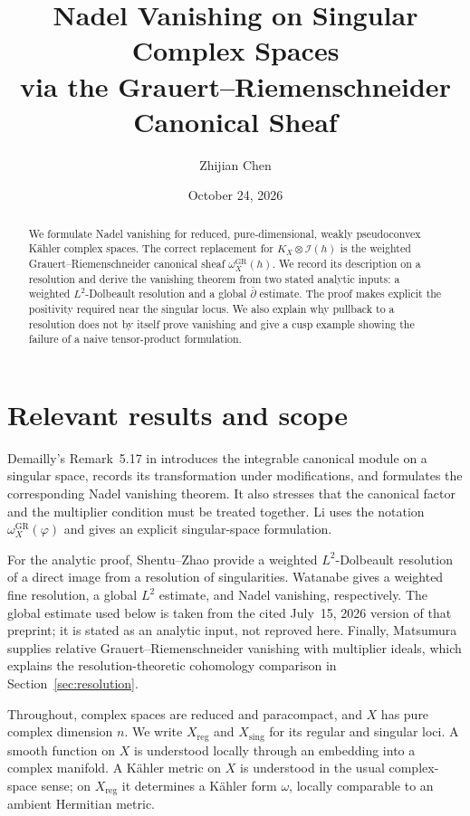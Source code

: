 \documentclass[11pt,a4paper,reqno]{amsart}
\title[Nadel vanishing on singular complex spaces]
{Nadel Vanishing on Singular Complex Spaces\\
via the Grauert--Riemenschneider Canonical Sheaf}
\author{Zhijian Chen}
\date{October 24, 2026}
\theoremstyle{definition}
\theoremstyle{remark}
\numberwithin{equation}{section}
\newcommand{\II}{\mathcal I}
\newcommand{\reg}{\mathrm{reg}}
\newcommand{\sing}{\mathrm{sing}}
\newcommand{\GR}{\mathrm{GR}}
\newcommand{\db}{\bar\partial}
\begin{document}
\begin{abstract}
We formulate Nadel vanishing for reduced, pure-dimensional, weakly
pseudoconvex K\"ahler complex spaces. The correct replacement for
$K_X\otimes\II(h)$ is the weighted Grauert--Riemenschneider canonical
sheaf $\omega_X^{\GR}(h)$. We record its description on a resolution and
derive the vanishing theorem from two stated analytic inputs: a weighted
$L^2$-Dolbeault resolution and a global $\db$ estimate. The proof makes
explicit the positivity required near the singular locus. We also explain
why pullback to a resolution does not by itself prove vanishing and give a
cusp example showing the failure of a naive tensor-product formulation.
\end{abstract}

\maketitle

\section{Relevant results and scope}

Demailly's Remark~5.17 in \cite{Demailly} introduces the integrable
canonical module on a singular space, records its transformation under
modifications, and formulates the corresponding Nadel vanishing theorem.
It also stresses that the canonical factor and the multiplier condition
must be treated together. Li \cite[Remark~2.2 and Theorem~2.3]{Li}
uses the notation $\omega_X^{\GR}(\varphi)$ and gives an explicit
singular-space formulation.

For the analytic proof, Shentu--Zhao \cite[Theorem~1.3]{ShentuZhao}
provide a weighted $L^2$-Dolbeault resolution of a direct image from a
resolution of singularities. Watanabe
\cite[Theorems~1.1, 1.3, and 1.4]{Watanabe} gives a weighted fine
resolution, a global $L^2$ estimate, and Nadel vanishing, respectively.
The global estimate used below is taken from the cited July~15, 2026
version of that preprint; it is stated as an analytic input, not reproved
here. Finally, Matsumura \cite[Corollary~1.5]{Matsumura} supplies relative
Grauert--Riemenschneider vanishing with multiplier ideals, which explains
the resolution-theoretic cohomology comparison in Section~\ref{sec:resolution}.

Throughout, complex spaces are reduced and paracompact, and $X$ has pure
complex dimension $n$. We write $X_{\reg}$ and $X_{\sing}$ for its regular
and singular loci. A smooth function on $X$ is understood locally through
an embedding into a complex manifold. A K\"ahler metric on $X$ is understood
in the usual complex-space sense; on $X_{\reg}$ it determines a K\"ahler
form $\omega$, locally comparable to an ambient Hermitian metric.
\end{document}
